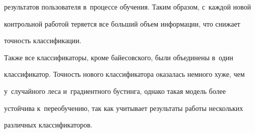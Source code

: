 результатов пользователя в~процессе обучения. Таким образом, с~каждой новой 


контрольной работой теряется все больший объем информации, что снижает 


точность клас\-си\-фи\-кации. 


{





}


     


     Также все классификаторы, кроме байесовского, были объединены в~один 


классификатор. Точность нового классификатора оказалась немного хуже, чем 


у~случайного леса и~градиентного бустинга, однако такая модель более 


устойчива к~переобучению, так как учитывает результаты работы нескольких 


различных классификаторов.





